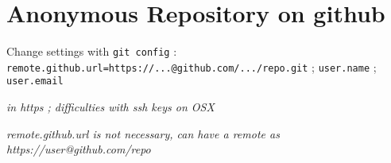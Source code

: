 \section*{Anonymous Repository on github}

Change settings with \texttt{git config} : \texttt{remote.github.url=https://...@github.com/.../repo.git} ; \texttt{user.name} ; \texttt{user.email}

\textit{in https ; difficulties with ssh keys on OSX}

\textit{remote.github.url is not necessary, can have a remote as https://user@github.com/repo}
















